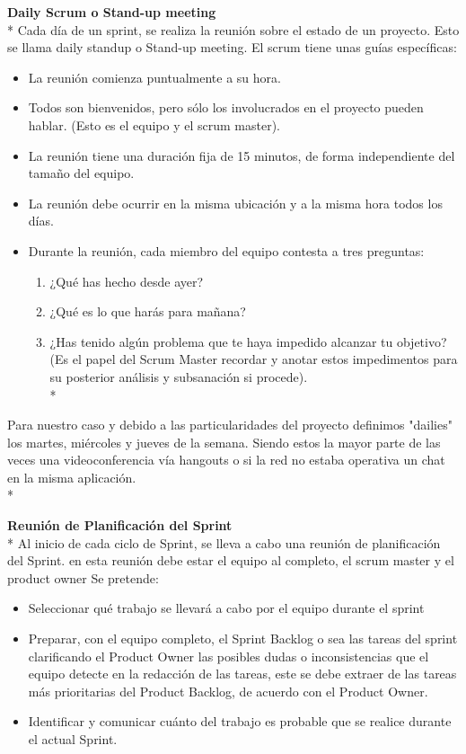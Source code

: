 \documentclass[../pfc.tex]{subfiles}
\begin{document}
	\textbf{Daily Scrum o Stand-up meeting}\\*
	Cada día de un sprint, se realiza la reunión sobre el estado de un proyecto. Esto se llama daily standup o Stand-up meeting. El scrum tiene unas guías específicas:
	\begin{itemize} 
		\item La reunión comienza puntualmente a su hora. 
		\item Todos son bienvenidos, pero sólo los involucrados en el proyecto pueden hablar. (Esto es el equipo y el scrum master). 
		\item La reunión tiene una duración fija de 15 minutos, de forma independiente del tamaño del equipo.
		\item La reunión debe ocurrir en la misma ubicación y a la misma hora todos los días.
		\item Durante la reunión, cada miembro del equipo contesta a tres preguntas:
		\begin{enumerate}
			\item ¿Qué has hecho desde ayer?
			\item ¿Qué es lo que harás para mañana?
			\item ¿Has tenido algún problema que te haya impedido alcanzar tu objetivo? (Es el papel del Scrum Master recordar y anotar estos impedimentos para su posterior análisis y subsanación si procede).\\*
		\end{enumerate} 
	\end{itemize}
	Para nuestro caso y debido a las particularidades del proyecto definimos "dailies" los martes, miércoles y jueves de la semana. Siendo estos la mayor parte de las veces una videoconferencia vía hangouts o si la red no estaba operativa un chat en la misma aplicación.\\*
	
	\textbf{Reunión de Planificación del Sprint}\\*
	Al inicio de cada ciclo de Sprint, se lleva a cabo una reunión de planificación del Sprint. en esta reunión debe estar el equipo al completo, el scrum master y el product owner Se pretende:
	\begin{itemize} 
		\item Seleccionar qué trabajo se llevará a cabo por el equipo durante el sprint 
		\item Preparar, con el equipo completo, el Sprint Backlog o sea las tareas del sprint clarificando el Product Owner las posibles dudas o  inconsistencias que el equipo detecte en la redacción de las tareas, este se debe extraer de las tareas más prioritarias del Product Backlog, de acuerdo con el Product Owner. 
		\item Identificar y comunicar cuánto del trabajo es probable que se realice durante el actual Sprint.
	\end{itemize}
	
\end{document}
